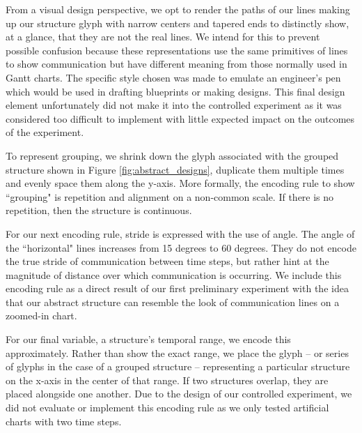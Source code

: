 From a visual design perspective, we opt to render the paths of our lines making up our structure glyph with narrow centers and tapered ends to distinctly show, at a glance, that they are not the real lines. We intend for this to prevent possible confusion because these representations use the same primitives of lines to show communication but have different meaning from those normally used in Gantt charts. The specific style chosen was made to emulate an engineer's pen which would be used in drafting blueprints or making designs. This final design element unfortunately did not make it into the controlled experiment as it was considered too difficult to implement with little expected impact on the outcomes of the experiment.


To represent grouping, we shrink down the glyph associated with the grouped structure shown in Figure \ref{fig:abstract_designs}, duplicate them multiple times and evenly space them along the y-axis. More formally, the encoding rule to show ``grouping" is repetition and alignment on a non-common scale. If there is no repetition, then the structure is continuous.


For our next encoding rule, stride is expressed with the use of angle. The angle of the ``horizontal" lines increases from 15 degrees to 60 degrees. They do not encode the true stride of communication between time steps, but rather hint at the magnitude of distance over which communication is occurring. We include this encoding rule as a direct result of our first preliminary experiment with the idea that our abstract structure can resemble the look of communication lines on a zoomed-in chart.

For our final variable, a structure's temporal range, we encode this approximately. Rather than show the exact range, we place the glyph -- or series of glyphs in the case of a grouped structure -- representing a particular structure on the x-axis in the center of that range. If two structures overlap, they are placed alongside one another. Due to the design of our controlled experiment, we did not evaluate or implement this encoding rule as we only tested artificial charts with two time steps. 

